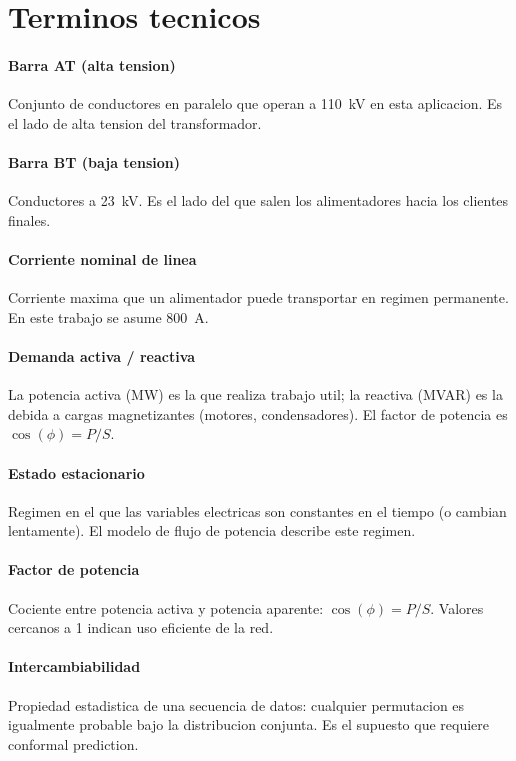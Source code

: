 \section{Terminos tecnicos}

\paragraph{Barra AT (alta tension)}
Conjunto de conductores en paralelo que operan a 110~kV en esta
aplicacion. Es el lado de alta tension del transformador.

\paragraph{Barra BT (baja tension)}
Conductores a 23~kV. Es el lado del que salen los alimentadores
hacia los clientes finales.

\paragraph{Corriente nominal de linea}
Corriente maxima que un alimentador puede transportar en regimen
permanente. En este trabajo se asume 800~A.

\paragraph{Demanda activa / reactiva}
La potencia activa (MW) es la que realiza trabajo util; la
reactiva (MVAR) es la debida a cargas magnetizantes (motores,
condensadores). El factor de potencia es $\cos(\phi) = P / S$.

\paragraph{Estado estacionario}
Regimen en el que las variables electricas son constantes en el
tiempo (o cambian lentamente). El modelo de flujo de potencia
describe este regimen.

\paragraph{Factor de potencia}
Cociente entre potencia activa y potencia aparente:
$\cos(\phi) = P / S$. Valores cercanos a 1 indican uso eficiente
de la red.

\paragraph{Intercambiabilidad}
Propiedad estadistica de una secuencia de datos: cualquier
permutacion es igualmente probable bajo la distribucion conjunta.
Es el supuesto que requiere conformal prediction.

